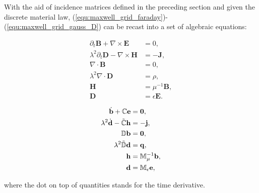 \documentclass{article}
\begin{document}
With the aid of incidence matrices defined in the preceding section and given the discrete
material law, (\ref{equ:maxwell_grid_faraday})-(\ref{equ:maxwell_grid_gauss_D}) can be
recast into a set of algebraic equations:
\begin{center}
\vspace{-0.5cm}
\begin{minipage}{0.3\textwidth}
\begin{align*}
    \partial_t \mathbf{B} + \nabla \times \mathbf{E} &= 0, \\
    \lambda^2\partial_t \mathbf{D} - \nabla \times \mathbf{H} &= -\mathbf{J}, \\
    \nabla \cdot \mathbf{B} &= 0,  \\
    \lambda^2\nabla \cdot \mathbf{D} &= \rho, \\
    \mathbf{H} &= \mu^{-1} \mathbf{B}, \\
    \mathbf{D} &= \epsilon \mathbf{E}. 
\end{align*}
\end{minipage}
\begin{minipage}{0.1\textwidth}
\centering
{}
\end{minipage}
\begin{minipage}{0.3\textwidth}
\begin{subequations}
\begin{align}
    \dot{\mathbf{b}} + \mathbb{C}\mathbf{e} &= \mathbf{0} , \label{equ:alg_faraday}\\
    \lambda^2\dot{\mathbf{d}} - \Tilde{\mathbb{C}}\mathbf{h} &= - \mathbf{j}, \label{equ:alg_empere}\\
    \mathbb{D}\mathbf{b} &= \mathbf{0},  \label{equ:alg_gauss_b}\\
    \lambda^2\Tilde{\mathbb{D}}\mathbf{d} &= \mathbf{q},  \label{equ:alg_gauss_d}\\
    \mathbf{h} &= \mathbb{M}_\mu^{-1} \mathbf{b}, \label{equ:alg_material_magnetic}\\
    \mathbf{d} &= \mathbb{M}_{\epsilon} \mathbf{e}, \label{equ:alg_material_electric} 
\end{align}
\end{subequations}
\end{minipage}
\end{center}
where the dot on top of quantities stands for the time derivative.
\end{document}
